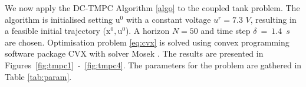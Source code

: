 \documentclass[letterpaper, 10 pt, conference]{ieeeconf}
\begin{document}

We now apply the DC-TMPC Algorithm \ref{algo} to the coupled tank problem. The algorithm is initialised setting $\bm{\mathrm{u}}^0$ with a constant voltage $u^r = 7.3$ $V$, resulting in a feasible initial trajectory ($\bm{\mathrm{x}}^0, \bm{\mathrm{u}}^0$). A horizon $N=50$ and time step $\delta~=~1.4$~$s$ are chosen. Optimisation problem \eqref{eq:cvx} is solved using convex programming software package CVX \cite{cvx} with solver Mosek \cite{mosek}. The results are presented in Figures~\ref{fig:tmpc1}~-~\ref{fig:tmpc4}. The parameters for the problem are gathered in Table \ref{tab:param}.
\end{document}
